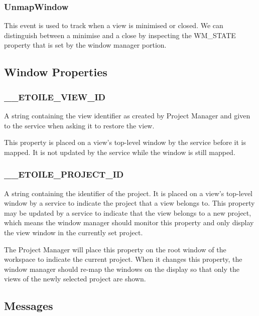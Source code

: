 \documentclass[11pt]{report}
\newcommand{\proman}{Project Manager\xspace}
\begin{document}
\subsubsection{UnmapWindow}
This event is used to track when a view is minimised or closed. We can distinguish between a minimise and a close by inspecting the WM\_STATE property that is set by the window manager portion.

\subsection{Window Properties}
\subsubsection{\_\_ETOILE\_VIEW\_ID}
A string containing the view identifier as created by \proman and given to the service when asking it to restore the view. 

This property is placed on a view's top-level window by the service before it is mapped. It is not updated by the service while the window is still mapped.

\subsubsection{\_\_ETOILE\_PROJECT\_ID}
A string containing the identifier of the project. It is placed on a view's top-level window by a service to indicate the project that a view belongs to. This property may be updated by a service to indicate that the view belongs to a new project, which means the window manager should monitor this property and only display the view window in the currently set project.

The \proman will place this property on the root window of the workspace to indicate the current project. When it changes this property, the window manager should re-map the windows on the display so that only the views of the newly selected project are shown.

\subsection{Messages}
\end{document}
